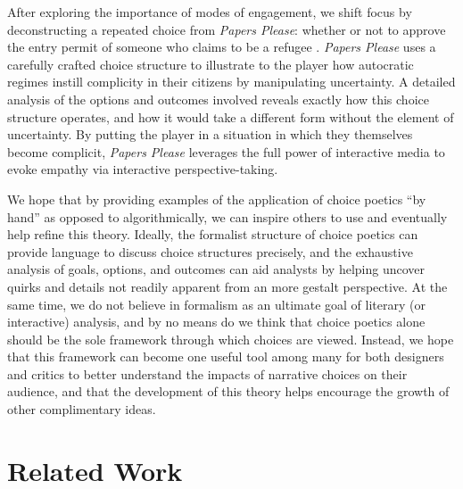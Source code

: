 \documentclass[arts,article,submit,moreauthors,pdftex,10pt,a4paper]{Definitions/mdpi}
\begin{document}
After exploring the importance of modes of engagement, we shift focus by deconstructing a repeated choice from \emph{Papers Please}: whether or not to approve the entry permit of someone who claims to be a refugee \citep{pope2013papers}.
%
\emph{Papers Please} uses a carefully crafted choice structure to illustrate to the player how autocratic regimes instill complicity in their citizens by manipulating uncertainty.
%
A detailed analysis of the options and outcomes involved reveals exactly how this choice structure operates, and how it would take a different form without the element of uncertainty.
%
By putting the player in a situation in which they themselves become complicit, \emph{Papers Please} leverages the full power of interactive media to evoke empathy via interactive perspective-taking.


We hope that by providing examples of the application of choice poetics ``by hand'' as opposed to algorithmically, we can inspire others to use and eventually help refine this theory.
%
Ideally, the formalist structure of choice poetics can provide language to discuss choice structures precisely, and the exhaustive analysis of goals, options, and outcomes can aid analysts by helping uncover quirks and details not readily apparent from an more gestalt perspective.
%
At the same time, we do not believe in formalism as an ultimate goal of literary (or interactive) analysis, and by no means do we think that choice poetics alone should be the sole framework through which choices are viewed.
%
Instead, we hope that this framework can become one useful tool among many for both designers and critics to better understand the impacts of narrative choices on their audience, and that the development of this theory helps encourage the growth of other complimentary ideas.

\section{Related Work}
\end{document}
